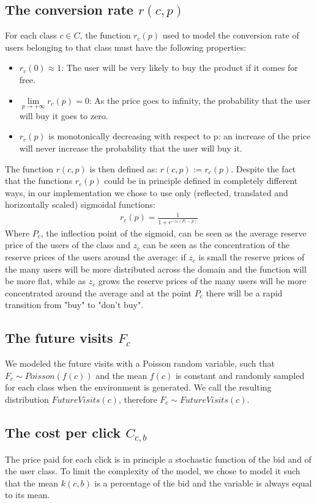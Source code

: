 \documentclass[11pt]{article} %
\begin{document}
\subsection{The conversion rate $r(c,p)$}
For each class $c \in C$, the function $r_c(p)$ used to model the conversion rate of users belonging to that class must have the following properties:
\begin{itemize}
\item $r_c(0) \approx 1$: The user will be very likely to buy the product if it comes for free.
\item $\lim\limits_{p \to +\infty} r_c(p) = 0$: As the price goes to infinity, the probability that the user will buy it goes to zero.
\item $r_c(p)$ is monotonically decreasing with respect to p: an increase of the price will never increase the probability that the user will buy it.
\end{itemize}
The function $r(c,p)$ is then defined as: $r(c,p) := r_c(p)$.
Despite the fact that the functions $r_c(p)$ could be in principle defined in completely different ways, in our implementation we chose to use only (reflected, translated and horizontally scaled) sigmoidal functions:
\begin{align*}
r_c(p) = \frac{1}{1+e^{-z_c(P_c-p)}}
\end{align*}
Where $P_c$, the inflection point of the sigmoid, can be seen as the average reserve price of the users of the class and $z_c$ can be seen as the concentration of the reserve prices of the users around the average: if $z_c$ is small the reserve prices of the many users will be more distributed across the domain and the function will be more flat, while as $z_c$ grows the reserve prices of the many users will be more concentrated around the average and at the point $P_c$ there will be a rapid transition from "buy" to "don't buy".

\subsection{The future visits $F_c$}
We modeled the future visits with a Poisson random variable, such that $F_c \sim Poisson(f(c))$ and the mean $f(c)$ is constant and randomly sampled for each class when the environment is generated. We call the resulting distribution $FutureVisits(c)$, therefore $F_c \sim FutureVisits(c)$.

\subsection{The cost per click $C_{c,b}$}
The price paid for each click is in principle a stochastic function of the bid and of the user class. To limit the complexity of the model, we chose to model it such that the mean $k(c,b)$ is a percentage of the bid and the variable is always equal to its mean.
\end{document}
